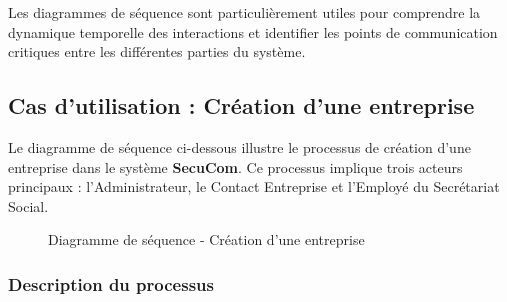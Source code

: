 \begin{note}
Les diagrammes de séquence sont particulièrement utiles pour comprendre la dynamique temporelle des interactions et identifier les points de communication critiques entre les différentes parties du système.
\end{note}

\subsection{Cas d'utilisation : Création d'une entreprise}

\noindent Le diagramme de séquence ci-dessous illustre le processus de création d'une entreprise dans le système \textbf{SecuCom}. Ce processus implique trois acteurs principaux : l'Administrateur, le Contact Entreprise et l'Employé du Secrétariat Social.

\vspace{0.5cm}

\begin{figure}[H]
\caption{Diagramme de séquence - Création d'une entreprise}
\end{figure}

\vspace{0.5cm}

\subsubsection{Description du processus}

